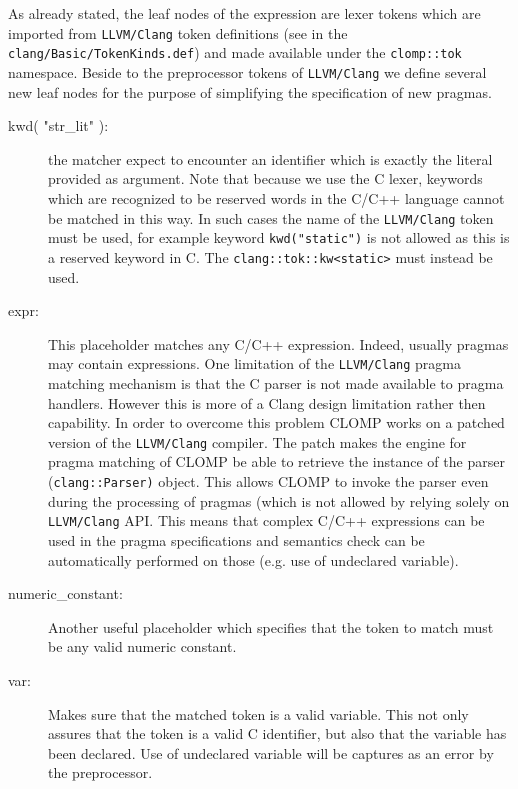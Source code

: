 \documentclass[10pt]{report}
\begin{document}
As already stated, the leaf nodes of the expression are lexer tokens which are
imported from {\tt LLVM/Clang} token definitions (see in the {\tt
clang/Basic/TokenKinds.def}) and made available under the {\tt clomp::tok}
namespace. Beside to the preprocessor tokens of {\tt LLVM/Clang} we define
several new leaf nodes for the purpose of simplifying the specification of new
pragmas. 

\begin{description}
\item [kwd( "str\_lit" ):] the matcher expect to encounter an identifier which is
exactly the literal provided as argument. Note that because we use the C lexer,
keywords which are recognized to be reserved words in the C/C++ language cannot
be matched in this way. In such cases the name of the {\tt LLVM/Clang} token
must be used, for example keyword {\tt kwd("static")} is not allowed as this is
a reserved keyword in C. The {\tt clang::tok::kw<static>} must instead be used. 

\item [expr:] This placeholder matches any C/C++ expression. Indeed, usually
pragmas may contain expressions. One limitation of the {\tt LLVM/Clang} pragma
matching mechanism is that the C parser is not made available to pragma
handlers. However this is more of a Clang design limitation rather then
capability. In order to overcome this problem CLOMP works on a patched version
of the {\tt LLVM/Clang} compiler.  The patch makes the engine for pragma
matching of CLOMP be able to retrieve the instance of the parser
({\tt clang::Parser)} object.  This allows CLOMP to invoke the parser even
during the processing of pragmas (which is not allowed by relying solely on {\tt
LLVM/Clang} API. This means that complex C/C++ expressions can be used in the
pragma specifications and semantics check can be automatically performed on
those (e.g. use of undeclared variable). 

\item [numeric\_constant:] Another useful placeholder which specifies that the
token to match must be any valid numeric constant. 

\item [var:] Makes sure that the matched token is a valid variable. This not
only assures that the token is a valid C identifier, but also that the variable
has been declared. Use of undeclared variable will be captures as an error by
the preprocessor. 
\end{description}
\end{document}
